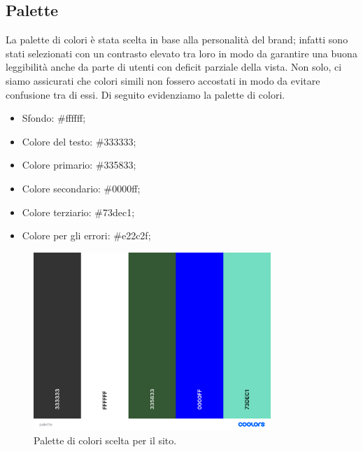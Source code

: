 \subsection{Palette}

La palette di colori è stata scelta in base alla personalità del brand;
infatti sono stati selezionati con un contrasto elevato tra loro in
modo da garantire una buona leggibilità anche da parte di utenti con deficit
parziale della vista.
Non solo, ci siamo assicurati che colori simili non fossero accostati in modo
da evitare confusione tra di essi. Di seguito evidenziamo la palette di colori.

\begin{itemize}
	\item Sfondo: \#ffffff;
	\item Colore del testo: \#333333;
	\item Colore primario: \#335833;
	\item Colore secondario: \#0000ff;
	\item Colore terziario: \#73dec1;
	\item Colore per gli errori: \#e22c2f;
\end{itemize}

\begin{figure}[h]
	\label{fig:palette}
	\centering
	\includegraphics[width=0.8\textwidth]{figures/palette.png}
	\caption{Palette di colori scelta per il sito.}
\end{figure}

